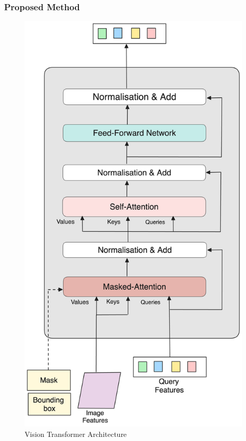 \documentclass{beamer}
\begin{document}
\begin{frame}
  \frametitle{Proposed Method}
  \begin{figure}[h!]
    \centering
    \includegraphics[scale=0.065]{Figures/emamt-decoder.png}
    \caption{Vision Transformer Architecture}
    \label{fig:proposed-model-Transformer}
  \end{figure}
\end{frame}
\end{document}
